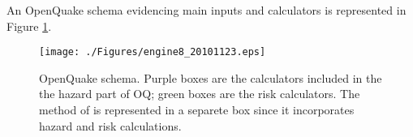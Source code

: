 An OpenQuake schema evidencing main inputs and calculators is represented in 
Figure \ref{fig:openquake_schema}.
\begin{figure}
\texttt{[image: ./Figures/engine8\_20101123.eps]}
\caption{OpenQuake schema. Purple boxes are the calculators included in the  
the hazard part of OQ; green boxes are the risk calculators. The method of 
\citet{wesson2009} is represented in a separete box since it incorporates 
hazard and risk calculations.}
\label{fig:openquake_schema}
\end{figure}
